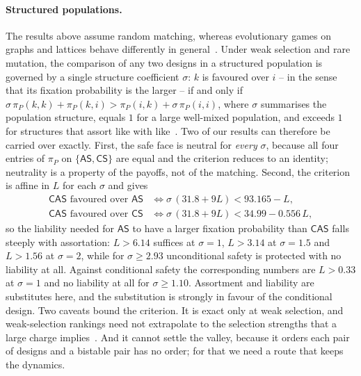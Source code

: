 \documentclass[pdflatex]{sn-jnl}
\theoremstyle{thmstyleone}
\theoremstyle{thmstylethree}
\theoremstyle{thmstyletwo}
\newcommand{\AS}{\textsf{AS}}
\newcommand{\CS}{\textsf{CS}}
\newcommand{\CAS}{\textsf{CAS}}
\newcommand{\piP}{\pi_{P}}
\begin{document}
\paragraph{Structured populations.}
The results above assume random matching, whereas evolutionary games on graphs
and lattices behave differently in
general~\citep{szabo2007graphs,perc2017statistical}. Under weak selection and
rare
mutation, the comparison of any two designs in a structured population is
governed by a single structure coefficient $\sigma$: $k$ is favoured over
$i$ -- in the sense that its fixation probability is the larger -- if and only
if
$\sigma\,\piP(k,k)+\piP(k,i)>\piP(i,k)+\sigma\,\piP(i,i)$, where $\sigma$
summarises the population structure, equals $1$ for a large well-mixed
population, and exceeds $1$ for structures that assort like with
like~\citep{tarnita2009strategy}. Two of our results can therefore be
carried over exactly. First, the safe face is neutral for \emph{every}
$\sigma$, because all four entries of $\piP$ on $\{\AS,\CS\}$ are equal and
the criterion reduces to an identity; neutrality is a property of the payoffs,
not of the matching. Second, the criterion is affine in $L$ for each $\sigma$
and gives
\begin{equation}
\begin{aligned}
\CAS \text{ favoured over } \AS &\iff \sigma\,(31.8+9L)<93.165-L,\\
\CAS \text{ favoured over } \CS &\iff \sigma\,(31.8+9L)<34.99-0.556\,L,
\end{aligned}
\label{eq:sigma}
\end{equation}
so the liability needed for $\AS$ to have a larger fixation probability than
$\CAS$ falls steeply with assortation: $L>6.14$ suffices at $\sigma=1$,
$L>3.14$ at $\sigma=1.5$ and $L>1.56$ at $\sigma=2$, while for
$\sigma\ge2.93$ unconditional safety is protected with no liability at all.
Against conditional safety the corresponding numbers are $L>0.33$ at
$\sigma=1$ and no liability at all for $\sigma\ge1.10$. Assortment and
liability are substitutes here, and the substitution is strongly in favour of
the conditional design. Two caveats bound the criterion. It is exact only at
weak selection, and weak-selection rankings need not extrapolate to the
selection strengths that a large charge implies~\citep{wu2013extrapolating}.
And it cannot settle the valley, because it orders each pair of designs and a
bistable pair has no order; for that we need a route that keeps the dynamics.
\end{document}
